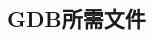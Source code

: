\documentclass[class=book, crop=false]{standalone}
\begin{document}
\begin{CJK}{UTF8}{gbsn}

\chapter{GDB所需文件}

















\cleardoublepage

\end{CJK}
\end{document}
